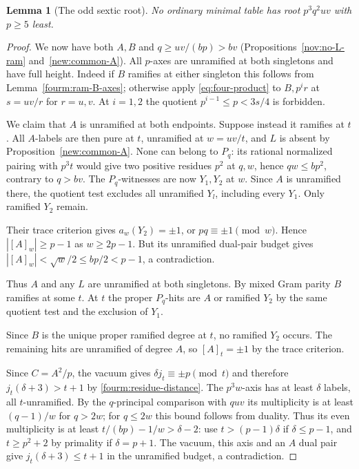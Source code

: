 \documentclass[11pt,a4paper]{article}
\numberwithin{equation}{section}
\newtheorem{lemma}[theorem]{Lemma}
\theoremstyle{remark}
\begin{document}
\begin{lemma}[The odd sextic root]\label{fam:M:12.9}\label{fourm:common-fields}
No ordinary minimal table has root $p^3q^2uv$ with $p\ge5$ least.
\end{lemma}
\begin{proof}
We now have both $A,B$ and $q\ge uv/(bp)>bv$
(Propositions~\ref{nov:no-L-ram} and~\ref{new:common-A}).
All $p$-axes are unramified at both singletons and have full height.
Indeed if $B$ ramifies at either singleton this follows from
Lemma~\ref{fourm:ram-B-axes}; otherwise apply \eqref{eq:four-product}
to $B,p^i r$ at $s=uv/r$ for $r=u,v$. At $i=1,2$ the quotient
$p^{i-1}\le p<3s/4$ is forbidden.

We claim that $A$ is unramified at both endpoints. Suppose instead
it ramifies at $t$. All $A$-labels are then pure at $t$, unramified
at $w=uv/t$, and $L$ is absent by Proposition~\ref{new:common-A}.
None can belong to $P_q$: its rational normalized pairing with
$p^3t$ would give two positive residues $p^2$ at $q,w$, hence
$qw\le bp^2$, contrary to $q>bv$. The $P_q$-witnesses are now $Y_1,Y_2$ at $w$.
Since $A$ is unramified there, the quotient test excludes all
unramified $Y_l$, including every $Y_1$. Only ramified $Y_2$ remain.

Their trace criterion gives $a_w(Y_2)=\pm1$, or $pq\equiv\pm1\pmod w$.
Hence $|[A]_w|\ge p-1$ as $w\ge2p-1$. But its unramified dual-pair
budget gives $|[A]_w|<\sqrt w/2\le bp/2<p-1$, a contradiction.

Thus $A$ and any $L$ are unramified at both singletons. By mixed
Gram parity $B$ ramifies at some $t$. At $t$ the proper $P_q$-hits are $A$ or ramified $Y_2$ by the
same quotient test and the exclusion of $Y_1$.

Since $B$ is the unique proper ramified degree at $t$, no ramified
$Y_2$ occurs. The remaining hits are unramified of degree $A$, so $[A]_t=\pm1$
by the trace criterion.

Since $C=A^2/p$, the vacuum gives $\delta j_t\equiv\pm p\pmod t$
and therefore $j_t(\delta+3)>t+1$ by \eqref{fourm:residue-distance}. The $p^3w$-axis has at least
$\delta$ labels, all $t$-unramified. By the $q$-principal comparison with $quv$ its multiplicity is at
least $(q-1)/w$ for $q>2w$; for $q\le2w$ this bound follows from
duality. Thus its even multiplicity is at least $t/(bp)-1/w>\delta-2$:
use $t>(p-1)\delta$ if $\delta\le p-1$, and $t\ge p^2+2$ by
primality if $\delta=p+1$.
The vacuum, this axis and an $A$ dual pair give
$j_t(\delta+3)\le t+1$ in the unramified budget, a contradiction.
\end{proof}
\end{document}
